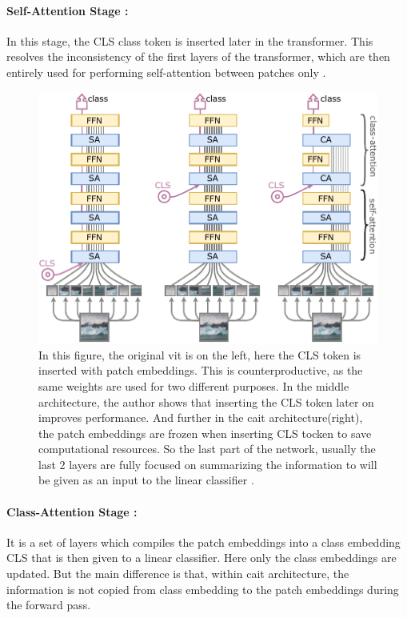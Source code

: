\paragraph{Self-Attention Stage :} In this stage, the CLS class token is inserted later in the transformer. This resolves the inconsistency of the first layers of the transformer, which are then entirely used for performing self-attention between patches only \cite{touvron2021going}. 

\begin{figure}
    \centering
    \includegraphics[width=0.75\linewidth]{Rohit_Master_Thesis//Images/cait_architecture.pdf}
    \caption{In this figure, the original \gls{vit} is on the left, here the CLS token is inserted with patch embeddings. This is counterproductive, as the same weights are used for two different purposes. In the middle architecture, the author shows that inserting the CLS token later on improves performance. And further in the \gls{cait} architecture(right), the patch embeddings are frozen when inserting CLS tocken to save computational resources. So the last part of the network, usually the last 2 layers are fully focused on summarizing the information to will be given as an input to the linear classifier \cite{touvron2021going}.}
    \label{fig:cait architecture}
\end{figure}

\paragraph{Class-Attention Stage :} It is a set of layers which compiles the patch embeddings into a class embedding CLS that is then given to a linear classifier. Here only the class embeddings are updated. But the main difference is that, within \gls{cait} architecture, the information is not copied from class embedding to the patch embeddings during the forward pass.

